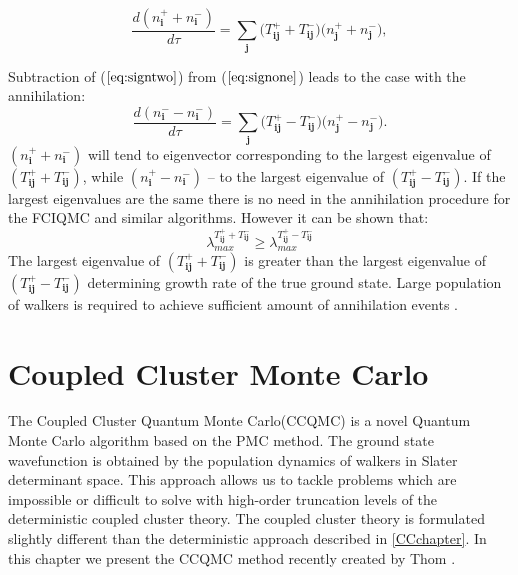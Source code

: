 \documentclass[twoside,english]{uiofysmaster}
\begin{document}
\begin{equation}\label{eq:signwithoutannihilation}
\frac{d ( n_{\boldsymbol{i}}^+ + n_{\boldsymbol{i}}^-)}{d \tau}=\sum_{\boldsymbol{j}}\big(T_{\boldsymbol{ij}}^+  + T_{\boldsymbol{ij}}^-\big) \big( n_{\boldsymbol{j}}^+ + n_{\boldsymbol{j}}^-\big),
\end{equation}

Subtraction of ($\ref{eq:signtwo}$) from ($\ref{eq:signone}$) leads to the case with the annihilation:
\begin{equation}\label{eq:signwithannihilation}
\frac{d (n_{\boldsymbol{i}}^- - n_{\boldsymbol{i}}^-)}{d \tau}=\sum_{\boldsymbol{j}}\big(T_{\boldsymbol{ij}}^+  - T_{\boldsymbol{ij}}^-\big) \big( n_{\boldsymbol{j}}^+ - n_{\boldsymbol{j}}^-\big).
\end{equation}
$(n_{\boldsymbol{i}}^+ + n_{\boldsymbol{i}}^-)$ will tend to eigenvector corresponding to the largest eigenvalue of $(T_{\boldsymbol{ij}}^+  + T_{\boldsymbol{ij}}^-)$, while $(n_{\boldsymbol{i}}^+ - n_{\boldsymbol{i}}^-)$ -- to the largest eigenvalue of $(T_{\boldsymbol{ij}}^+  - T_{\boldsymbol{ij}}^-)$. If the largest eigenvalues are the same there is no need in the annihilation procedure for the FCIQMC and similar algorithms. However it can be shown\cite{Spencersignproblempopulation2012} that:
\begin{equation}
	\lambda_{max}^{T_{\boldsymbol{ij}}^+  + T_{\boldsymbol{ij}}^-}   \geq  \lambda_{max}^{T_{\boldsymbol{ij}}^+  - T_{\boldsymbol{ij}}^-}
\end{equation}
The largest eigenvalue of $(T_{\boldsymbol{ij}}^+  + T_{\boldsymbol{ij}}^-)$ is greater than the largest eigenvalue of $(T_{\boldsymbol{ij}}^+  - T_{\boldsymbol{ij}}^-)$ determining growth rate of the true ground state. Large population of walkers is required to achieve sufficient amount of annihilation events\cite{BoothFermionMonteCarlo2009} \cite{Spencersignproblempopulation2012}.





\chapter{Coupled Cluster Monte Carlo}\label{CCQMCChap}

The Coupled Cluster Quantum Monte Carlo(CCQMC) is a novel Quantum Monte Carlo algorithm based on the PMC method. The ground state wavefunction is obtained by the population dynamics of walkers in Slater determinant space. This approach allows us to tackle problems which are impossible or difficult to solve with high-order truncation levels of the deterministic coupled cluster theory. The coupled cluster theory is formulated slightly different than the deterministic approach described in \autoref{CCchapter}.
In this chapter we present the CCQMC method recently created by Thom \cite{ThomStochasticCoupledCluster2010}.
\end{document}
